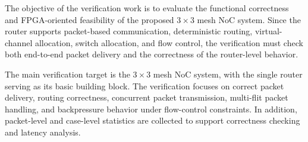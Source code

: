 The objective of the verification work is to evaluate the functional correctness and FPGA-oriented feasibility of the proposed $3 \times 3$ mesh NoC system. Since the router supports packet-based communication, deterministic routing, virtual-channel allocation, switch allocation, and flow control, the verification must check both end-to-end packet delivery and the correctness of the router-level behavior.

The main verification target is the $3 \times 3$ mesh NoC system, with the single router serving as its basic building block. The verification focuses on correct packet delivery, routing correctness, concurrent packet transmission, multi-flit packet handling, and backpressure behavior under flow-control constraints. In addition, packet-level and case-level statistics are collected to support correctness checking and latency analysis.

